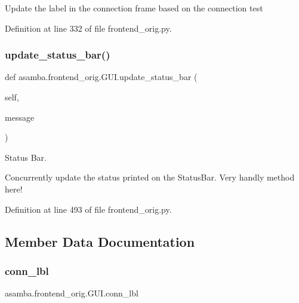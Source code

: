 \begin{DoxyVerb}Update the label in the connection frame based on the connection test \end{DoxyVerb}
 

Definition at line 332 of file frontend\+\_\+orig.\+py.

\mbox{\label{classasamba_1_1frontend__orig_1_1_g_u_i_a630301b7e934776f232fcb4562974ae9}} 
\subsubsection{\texorpdfstring{update\+\_\+status\+\_\+bar()}{update\_status\_bar()}}
{\footnotesize\ttfamily def asamba.\+frontend\+\_\+orig.\+G\+U\+I.\+update\+\_\+status\+\_\+bar (\begin{DoxyParamCaption}\item[{}]{self,  }\item[{}]{message }\end{DoxyParamCaption})}



Status Bar. 

\begin{DoxyVerb}Concurrently update the status printed on the StatusBar. Very handly method here! \end{DoxyVerb}
 

Definition at line 493 of file frontend\+\_\+orig.\+py.



\subsection{Member Data Documentation}
\mbox{\label{classasamba_1_1frontend__orig_1_1_g_u_i_a8ffe858f422b6affa1bc05765e05f360}} 
\subsubsection{\texorpdfstring{conn\+\_\+lbl}{conn\_lbl}}
{\footnotesize\ttfamily asamba.\+frontend\+\_\+orig.\+G\+U\+I.\+conn\+\_\+lbl}



